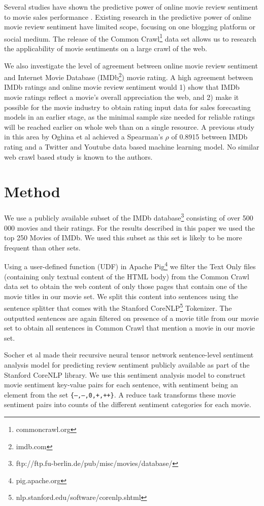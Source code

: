 \documentclass{sig-alternate-br}
\begin{document}
Several studies have shown the predictive power of online movie review sentiment to movie sales performance \cite{Mishne2006, Liu2007, Dellarocas2007, Asur2010, Joshi2010, Yu2012}. Existing research in the predictive power of online movie review sentiment have limited scope, focusing on one blogging platform or social medium. The release of the Common Crawl\footnote{commoncrawl.org} data set allows us to research the applicability of movie sentiments on a large crawl of the web.  

We also investigate the level of agreement between online movie review sentiment and Internet Movie Database (IMDb\footnote{imdb.com}) movie rating. A high agreement between IMDb ratings and online movie review sentiment would 1) show that IMDb movie ratings reflect a movie's overall appreciation the web, and 2) make it possible for the movie industry to obtain rating input data for sales forecasting models in an earlier stage, as the minimal sample size needed for reliable ratings will be reached earlier on whole web than on a single resource. A previous study in this area by Oghina et al \cite{Oghina2012} achieved a Spearman's $\rho$ of 0.8915 between IMDb rating and a Twitter and Youtube data based machine learning model. No similar web crawl based study is known to the authors.

\section{Method}
We use a publicly available subset of the IMDb database\footnote{ftp://ftp.fu-berlin.de/pub/misc/movies/database/} consisting of over 500 000 movies and their ratings. For the results described in this paper we used the top 250 Movies of IMDb. We used this subset as this set is likely to be more frequent than other sets.

Using a user-defined function (UDF) in Apache Pig\footnote{pig.apache.org} we filter the Text Only files (containing only textual content of the HTML body) from the Common Crawl data set to obtain the web content of only those pages that contain one of the movie titles in our movie set. We split this content into sentences using the sentence splitter that comes with the Stanford CoreNLP\footnote{nlp.stanford.edu/software/corenlp.shtml} Tokenizer. The outputted sentences are again filtered on presence of a movie title from our movie set to obtain all sentences in Common Crawl that mention a movie in our movie set.

Socher et al \cite{Socher2013} made their recursive neural tensor network sentence-level sentiment analysis model for predicting review sentiment publicly available as part of the Stanford CoreNLP library. We use this sentiment analysis model to construct movie sentiment key-value pairs for each sentence, with sentiment being an element from the set \texttt{\{\mbox{---},--,0,+,\mbox{++}\}}. A reduce task transforms these movie sentiment pairs into counts of the different sentiment categories for each movie. 
\end{document}

